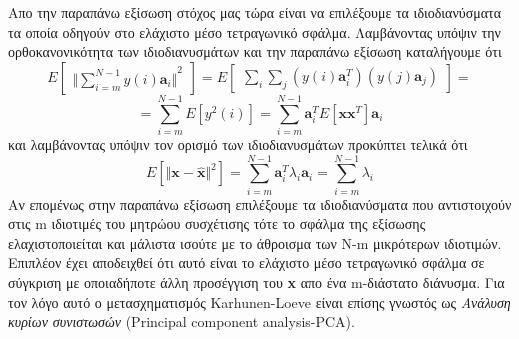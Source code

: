 Απο την παραπάνω εξίσωση στόχος μας τώρα είναι να επιλέξουμε τα ιδιοδιανύσματα τα οποία οδηγούν στο ελάχιστο μέσο τετραγωνικό σφάλμα. Λαμβάνοντας υπόψιν την ορθοκανονικότητα των ιδιοδιανυσμάτων και την παραπάνω εξίσωση καταλήγουμε ότι
\newline\hspace*{\fill}
\begin{equation}
 	Ε   \begin{bmatrix}
	{\Vert \sum_{i=m}^{N-1} y(i)\mathbf{a}_{i} \Vert}^{2}        
        \end{bmatrix}
    = Ε \begin{bmatrix}
	\sum_{i}\sum_{j} (y(i)\mathbf{a}_{i}^{T})(y(j)\mathbf{a}_{j})        
        \end{bmatrix} = 
\end{equation}
\hspace*{\fill}
\newline\hspace*{\fill}
\begin{equation}
    = \sum_{i=m}^{N-1} E[y^{2}(i)]
    = \sum_{i=m}^{N-1} \mathbf{a}_{i}^{T} E[\mathbf{x}\mathbf{x}^{T}]\mathbf{a}_{i}
\end{equation}
\hspace*{\fill}\newline
και λαμβάνοντας υπόψιν τον ορισμό των ιδιοδιανυσμάτων προκύπτει τελικά ότι
\newline\hspace*{\fill}
\begin{equation}
         Ε[{\Vert \mathbf{x}-\mathbf{\widehat{x}} \Vert}^{2}] = \sum_{i=m}^{N-1} \mathbf{a}_{i}^{Τ}\lambda_{i}\mathbf{a}_{i} = 
         \sum_{i=m}^{N-1} \lambda_{i} 
\end{equation}
\hspace*{\fill}\newline
Αν επομένως στην παραπάνω εξίσωση επιλέξουμε τα ιδιοδιανύσματα που αντιστοιχούν στις \textlatin{m} ιδιοτιμές του μητρώου συσχέτισης τότε το σφάλμα της εξίσωσης ελαχιστοποιείται και μάλιστα ισούτε με το άθροισμα των \textlatin{N-m} μικρότερων ιδιοτιμών. Επιπλέον έχει αποδειχθεί ότι αυτό είναι το ελάχιστο μέσο τετραγωνικό σφάλμα σε σύγκριση με οποιαδήποτε άλλη προσέγγιση του \textlatin{\textbf{x}} απο ένα \textlatin{m}-διάστατο διάνυσμα. Για τον λόγο αυτό ο μετασχηματισμός \textlatin{Karhunen-Loeve} είναι επίσης γνωστός ως \textit{Ανάλυση κυρίων συνιστωσών} \textlatin{(Principal component analysis-PCA)}.

